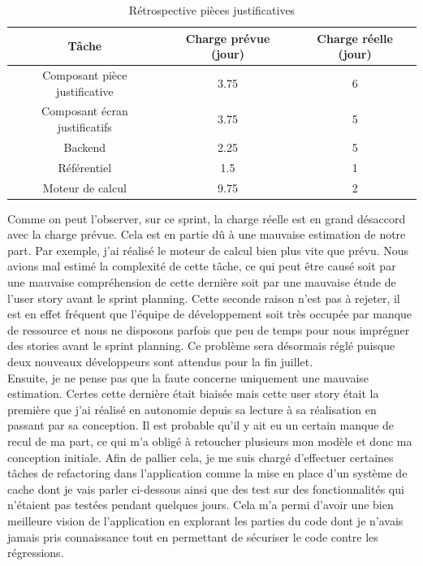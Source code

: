 \begin{table}[h!]
	\center
	\begin{tabular}{| c | c | c |}
     \hline
     Tâche & Charge prévue (jour) & Charge réelle (jour) \\ \hline
     Composant pièce justificative & 3.75 & 6\\ \hline
     Composant écran justificatifs & 3.75 & 5\\ \hline
     Backend & 2.25 & 5\\ \hline
     Référentiel & 1.5 & 1\\ \hline
     Moteur de calcul & 9.75 & 2\\
     \hline
	\end{tabular}
	\caption{Rétrospective pièces justificatives}
	\label{retroPJ}
\end{table}
	
	Comme on peut l'observer, sur ce sprint, la charge réelle est en grand désaccord avec la charge prévue. Cela est en partie dû à une mauvaise estimation de notre part. Par exemple, j'ai réalisé le moteur de calcul bien plus vite que prévu. Nous avions mal estimé la complexité de cette tâche, ce qui peut être causé soit par une mauvaise compréhension de cette dernière soit par une mauvaise étude de l'user story avant le sprint planning. Cette seconde raison n'est pas à rejeter, il est en effet fréquent que l'équipe de développement soit très occupée par manque de ressource et nous ne disposons parfois que peu de temps pour nous imprégner des stories avant le sprint planning. Ce problème sera désormais réglé puisque deux nouveaux développeurs sont attendus pour la fin juillet. \\
	
	Ensuite, je ne pense pas que la faute concerne uniquement une mauvaise estimation. Certes cette dernière était biaisée mais cette user story était la première que j'ai réalisé en autonomie depuis sa lecture à sa réalisation en passant par sa conception. Il est probable qu'il y ait eu un certain manque de recul de ma part, ce qui m'a obligé à retoucher plusieurs mon modèle et donc ma conception initiale. Afin de pallier cela, je me suis chargé d'effectuer certaines tâches de refactoring dans l'application comme la mise en place d'un système de cache dont je vais parler ci-dessous ainsi que des test sur des fonctionnalités qui n'étaient pas testées pendant quelques jours. Cela m'a permi d'avoir une bien meilleure vision de l'application en explorant les parties du code dont je n'avais jamais pris connaissance tout en permettant de sécuriser le code contre les régressions. \\
	
